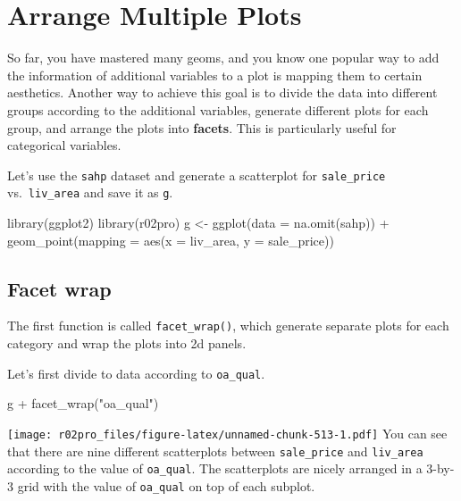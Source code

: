 \documentclass[
]{book}
\newenvironment{Shaded}{\begin{snugshade}}{\end{snugshade}}
\newcommand{\AttributeTok}[1]{\textcolor[rgb]{0.77,0.63,0.00}{#1}}
\newcommand{\FunctionTok}[1]{\textcolor[rgb]{0.00,0.00,0.00}{#1}}
\newcommand{\NormalTok}[1]{#1}
\newcommand{\OtherTok}[1]{\textcolor[rgb]{0.56,0.35,0.01}{#1}}
\newcommand{\SpecialCharTok}[1]{\textcolor[rgb]{0.00,0.00,0.00}{#1}}
\newcommand{\StringTok}[1]{\textcolor[rgb]{0.31,0.60,0.02}{#1}}
\begin{document}
\hypertarget{arrange-multi-plots}{%
\section{Arrange Multiple Plots}\label{arrange-multi-plots}}

So far, you have mastered many geoms, and you know one popular way to add the information of additional variables to a plot is mapping them to certain aesthetics. Another way to achieve this goal is to divide the data into different groups according to the additional variables, generate different plots for each group, and arrange the plots into \textbf{facets}. This is particularly useful for categorical variables.

Let's use the \texttt{sahp} dataset and generate a scatterplot for \texttt{sale\_price} vs.~\texttt{liv\_area} and save it as \texttt{g}.

\begin{Shaded}
\begin{Highlighting}[]
\FunctionTok{library}\NormalTok{(ggplot2)}
\FunctionTok{library}\NormalTok{(r02pro)}
\NormalTok{g }\OtherTok{\textless{}{-}} \FunctionTok{ggplot}\NormalTok{(}\AttributeTok{data =} \FunctionTok{na.omit}\NormalTok{(sahp)) }\SpecialCharTok{+} \FunctionTok{geom\_point}\NormalTok{(}\AttributeTok{mapping =} \FunctionTok{aes}\NormalTok{(}\AttributeTok{x =}\NormalTok{ liv\_area, }\AttributeTok{y =}\NormalTok{ sale\_price))}
\end{Highlighting}
\end{Shaded}

\hypertarget{facet-wrap}{%
\subsection{Facet wrap}\label{facet-wrap}}

The first function is called \texttt{facet\_wrap()}, which generate separate plots for each category and wrap the plots into 2d panels.

Let's first divide to data according to \texttt{oa\_qual}.

\begin{Shaded}
\begin{Highlighting}[]
\NormalTok{g }\SpecialCharTok{+} \FunctionTok{facet\_wrap}\NormalTok{(}\StringTok{"oa\_qual"}\NormalTok{)}
\end{Highlighting}
\end{Shaded}

\texttt{[image: r02pro\_files/figure-latex/unnamed-chunk-513-1.pdf]}
You can see that there are nine different scatterplots between \texttt{sale\_price} and \texttt{liv\_area} according to the value of \texttt{oa\_qual}. The scatterplots are nicely arranged in a 3-by-3 grid with the value of \texttt{oa\_qual} on top of each subplot.
\end{document}
